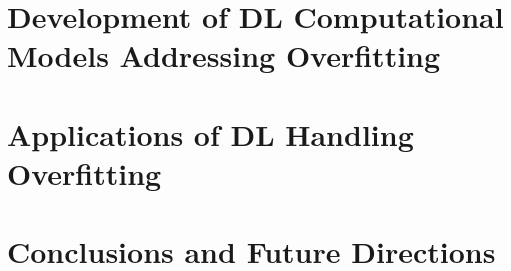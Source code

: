 \documentclass[oneside,12pt,article]{article}
\begin{document}
\section{Development of DL Computational Models Addressing Overfitting}
\section{Applications of DL Handling Overfitting}
\section{Conclusions and Future Directions}
\appendix




\printglossaries

%
%

\newpage 


\end{document}
